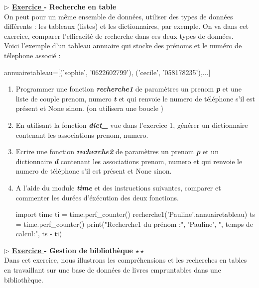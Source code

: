 \documentclass[12pt,french]{article}
\newcounter{npb}
\newcommand{\exo}{
    \stepcounter{npb}
    {\textbf{$\triangleright$ \underline{Exercice \arabic{npb} }}}
}
\begin{document}
\exo \textbf{- Recherche en table}\\
On peut pour un même ensemble de données, utiliser des types de données différents : les tableaux (listes) et les dictionnaires, par exemple. On va dans cet exercice, comparer l'efficacité de recherche dans ces deux types de données.\\
Voici l'exemple d'un tableau annuaire qui stocke des prénoms et le numéro de télephone associé :
\begin{tcolorbox}[enhanced,colback=blue!5!white,colframe=blue!75!black]	
\begin{pyverbatim}
annuairetableau=[('sophie', '0622602799'), ('cecile', '058178235'),...]
\end{pyverbatim}
\end{tcolorbox}
\begin{enumerate}
	\item Programmer une fonction \textbf{\textsl{recherche1}} de paramètres un prenom \textbf{\textsl{p}} et une liste de couple prenom, numero \textbf{\textsl{t}} et qui renvoie le numero de téléphone s'il est présent et None sinon.
	(on utilisera une boucle )
	\item En utilisant la fonction \textbf{\textsl{dict\_}} vue dans l'exercice 1, générer un dictionnaire contenant les associations prenom, numero.
	\item Ecrire une fonction \textbf{\textsl{recherche2}} de paramètres un prenom \textbf{\textsl{p}} et  un dictionnaire \textbf{\textsl{d}} contenant les associations prenom, numero et qui renvoie le numero de téléphone s'il est présent et None sinon.
	\item A l'aide du module \textbf{\textsl{time}} et des instructions suivantes, comparer et commenter les durées d'éxécution des deux fonctions.\\ 
\begin{tcolorbox}[enhanced,colback=blue!5!white,colframe=blue!75!black]	
\begin{pyverbatim}
import time
ti = time.perf_counter()
recherche1('Pauline',annuairetableau)
ts = time.perf_counter()
print("Recherche1 du prénom :", 'Pauline', ", temps de calcul:", ts - ti)	
\end{pyverbatim}
\end{tcolorbox}
\end{enumerate}
\exo\textbf{ - Gestion de bibliothèque $\star \star $}\\
Dans cet exercice, nous illustrons les compréhensions et les recherches en tables en travaillant sur une base de données de livres empruntables dans une bibliothèque.
\end{document}
